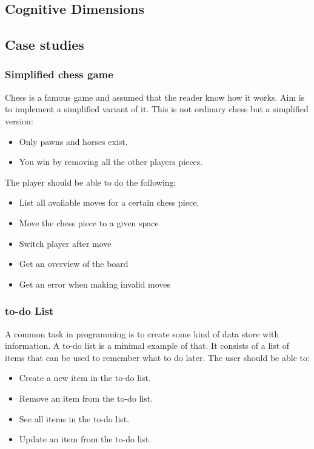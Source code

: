 \documentclass[12pt]{article}
\theoremstyle{definition}
\theoremstyle{theorem}
\begin{document}
\subsection{Cognitive Dimensions}

\subsection{Case studies}

\subsubsection{Simplified chess game}

Chess is a famous game and assumed that the reader know how it works. Aim
is to implement a simplified variant of it. This is not ordinary chess but a
simplified version:

\begin{itemize} 
    \item Only pawns and horses exist.
    \item You win by removing all the other players pieces.
\end{itemize}

The player should be able to do the following:

\begin{itemize} 
    \item List all available moves for a certain chess piece. 
    \item Move the chess piece to a given space
    \item Switch player after move
    \item Get an overview of the board
    \item Get an error when making invalid moves
\end{itemize}

\subsubsection{to-do List}

A common task in programming is to create some kind of data store with
information. A to-do list is a minimal example of that. It consists of a list of
items that can be used to remember what to do later. The user should be able to:

\begin{itemize}
    \item Create a new item in the to-do list.
    \item Remove an item from the to-do list.
    \item See all items in the to-do list.
    \item Update an item from the to-do list.
\end{itemize}
\end{document}
